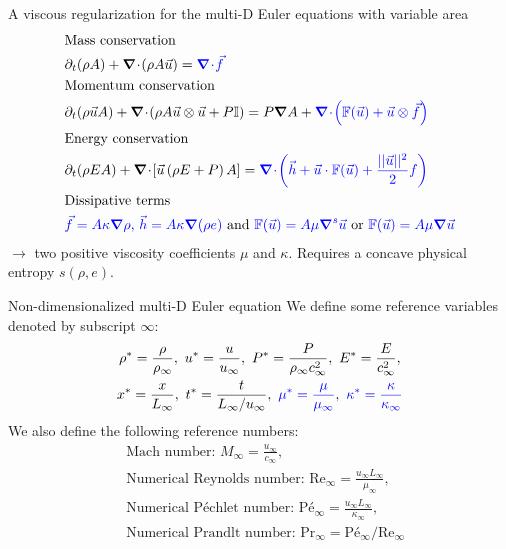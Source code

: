 \documentclass[xcolor=dvipsnames,10pt]{beamer}
\renewcommand{\Re}{\textrm{Re}}
\newcommand{\Pe}{\textrm{P\'e}}
\renewcommand{\Pr}{\textrm{Pr}}
\renewcommand{\div}{\boldsymbol{\nabla}\! \cdot \!}
\newcommand{\grad}{\boldsymbol{\nabla}}
\begin{document}
\begin{frame}{A viscous regularization for the multi-D Euler equations with variable area}
\begin{align}
&\text{Mass conservation} \nonumber \\
&\partial_t ( \rho A ) + \div \left( \rho A \vec{u} \right) = \textcolor{blue}{\div \vec{f}} \nonumber \\
&\text{Momentum conservation} \nonumber \\
&\partial_t ( \rho \vec{u} A ) + \div \left( \rho A \vec{u} \otimes \vec{u} + P \mathbb{I} \right) = P \grad A + \textcolor{blue}{\div \left( \mathbb{F}(\vec{u}) + \vec{u} \otimes \vec{f} \right)} \nonumber \\
&\text{Energy conservation} \nonumber \\
&\partial_t ( \rho E A ) + \div \left[ \vec{u} \left( \rho E + P \right) A \right] = \textcolor{blue}{\div \left( \vec{h} + \vec{u}\cdot \mathbb{F}(\vec{u}) + \frac{|| \vec{u} ||^2}{2} f \right)} \nonumber \\
&\text{Dissipative terms} \nonumber \\
& \textcolor{blue}{\vec{f} = A \kappa \grad \rho \text{, } \vec{h} = A \kappa \grad ( \rho e) } \nonumber
\text{ and } \textcolor{blue}{\mathbb{F}(\vec{u}) = A \mu \grad^s \vec{u}} \text{ or } \textcolor{blue}{\mathbb{F}(\vec{u}) = A \mu \grad \vec{u}}
\end{align}
$\to$ two positive viscosity coefficients $\mu$ and $\kappa$. Requires a concave physical entropy $s(\rho,e)$.
\end{frame}
\begin{frame}{Non-dimensionalized multi-D Euler equation}
We define some reference variables denoted by subscript $\infty$:
\begin{multline}
\label{eq:norm_param}
\rho^*   = \frac{\rho}{\rho_\infty}           ,\
u^*      = \frac{u}{u_\infty}                 ,\
P^*      = \frac{P}{\rho_\infty c^2_\infty}   ,\
E^*      = \frac{E}{c^2_\infty }              ,\\
x^* = \frac{x}{L_\infty}                      ,\
t^* = \frac{t}{L_\infty / u_\infty}           ,\ 
\textcolor{blue}{\mu^*    = \frac{\mu}{\mu_\infty}}             ,\
\textcolor{blue}{\kappa^* = \frac{\kappa}{\kappa_\infty}}     \nonumber
\end{multline}
We also define the following reference numbers:
\begin{align}
&\text{Mach number: }M_\infty = \frac{u_\infty}{c_\infty}, \nonumber\\
&\text{Numerical Reynolds number: }\Re_\infty = \frac{u_\infty L_\infty}{\mu_\infty} , \nonumber \\
&\text{Numerical P\'echlet number: }\Pe_\infty = \frac{u_\infty L_\infty}{\kappa_\infty} , \nonumber \\
&\text{Numerical Prandlt number: }\Pr_\infty = \Pe_\infty / \Re_\infty \nonumber \nonumber
\end{align}
\end{frame}
\end{document}
